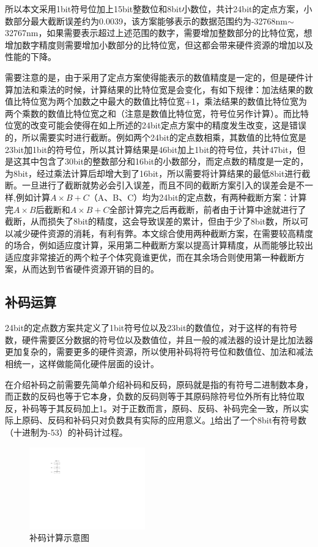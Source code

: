 所以本文采用1bit符号位加上15bit整数位和8bit小数位，共计24bit的定点方案，小数部分最大截断误差约为0.0039，该方案能够表示的数据范围约为-32768nm$\sim$32767nm，如果需要表示超过上述范围的数字，需要增加整数部分的比特位宽，想增加数字精度则需要增加小数部分的比特位宽，但这都会带来硬件资源的增加以及性能的下降。

需要注意的是，由于采用了定点方案使得能表示的数值精度是一定的，但是硬件计算加法和乘法的时候，计算结果的比特位宽是会变化，有如下规律：加法结果的数值比特位宽为两个加数之中最大的数值比特位宽+1，乘法结果的数值比特位宽为两个乘数的数值比特位宽之和（注意是数值比特位宽，符号位另作计算）。而比特位宽的改变可能会使得在如上所述的24bit定点方案中的精度发生改变，这是错误的，所以需要实时进行截断。例如两个24bit的定点数相乘，其数值的比特位宽是23bit加1bit的符号位，所以其计算结果是46bit加上1bit的符号位，共计47bit，但是这其中包含了30bit的整数部分和16bit的小数部分，而定点数的精度是一定的，为8bit，经过乘法计算后却增大到了16bit，所以需要将计算结果的最低8bit进行截断。一旦进行了截断就势必会引入误差，而且不同的截断方案引入的误差会是不一样,例如计算$A\times B+C$（A、B、C）均为24bit的定点数，有两种截断方案：计算完$A\times B$后截断和$A\times B+C$全部计算完之后再截断，前者由于计算中途就进行了截断，从而损失了8bit的精度，这会导致误差的累计，但由于少了8bit数，所以可以减少硬件资源的消耗，有利有弊。本文综合使用两种截断方案，在需要较高精度的场合，例如适应度计算，采用第二种截断方案以提高计算精度，从而能够比较出适应度非常接近的两个粒子个体究竟谁更优，而在其余场合则使用第一种截断方案，从而达到节省硬件资源开销的目的。

\subsection{补码运算}
24bit的定点数方案共定义了1bit符号位以及23bit的数值位，对于这样的有符号数，硬件需要区分数据的符号位以及数值位，并且一般的减法器的设计是比加法器更加复杂的，需要更多的硬件资源，所以使用补码将符号位和数值位、加法和减法相统一，这样做能简化硬件层面的设计\cite{赵黎娜2011补码表示的定点数取值范围分析}。

在介绍补码之前需要先简单介绍补码和反码，原码就是指的有符号二进制数本身，而正数的反码也等于它本身，负数的反码则等于其原码除符号位外所有比特位取反，补码等于其反码加上1。对于正数而言，原码、反码、补码完全一致，所以实际上原码、反码和补码只对负数具有实际的应用意义。\ref{fig:补码计算示意图}给出了一个8bit有符号数（十进制为-53）的补码计过程。
\begin{figure}[htb]
  \centering
  \includegraphics[width=5cm]{fig/4-fig/补码计算示意图.pdf}
  \caption{补码计算示意图}
  \label{fig:补码计算示意图}
\end{figure}

